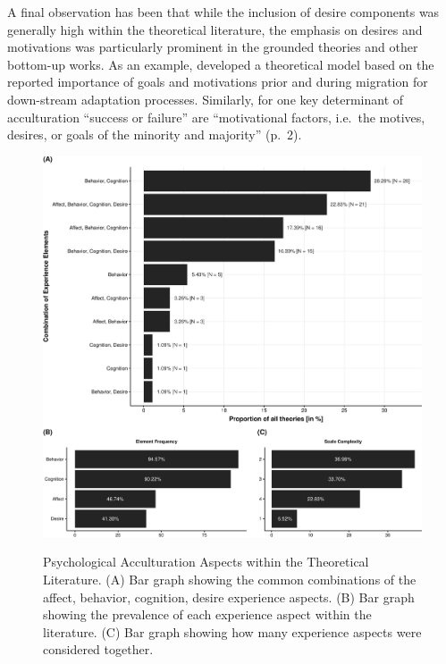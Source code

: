 A final observation has been that while the inclusion of desire
components was generally high within the theoretical literature, the
emphasis on desires and motivations was particularly prominent in the
grounded theories and other bottom-up works. As an example,
\citet[][]{Kim2019} developed a theoretical model based on the reported
importance of goals and motivations prior and during migration for
down-stream adaptation processes. Similarly, for
\citet[][]{Mchitarjan2015} one key determinant of acculturation
``success or failure'' are ``motivational factors, i.e.~the motives,
desires, or goals of the minority and majority'' (p.~2). \color{black}

\begin{figure}[h]
\centering
\caption{Psychological Acculturation Aspects within the Theoretical Literature. (A) Bar graph showing the common combinations of the affect, behavior, cognition, desire experience aspects. (B) Bar graph showing the prevalence of each experience aspect within the literature. (C) Bar graph showing how many experience aspects were considered together.}
\includegraphics[width=\textwidth]{Figures/TheoriesFreq-1}
\label{fig:ElementsTheories}
\end{figure}



